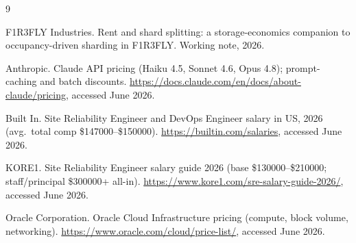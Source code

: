 \documentclass[11pt]{article}
\begin{document}
\begin{thebibliography}{9}

F1R3FLY Industries.
\newblock Rent and shard splitting: a storage-economics companion to occupancy-driven sharding in F1R3FLY.
\newblock Working note, 2026.

Anthropic.
\newblock Claude API pricing (Haiku 4.5, Sonnet 4.6, Opus 4.8); prompt-caching and batch discounts.
\newblock \url{https://docs.claude.com/en/docs/about-claude/pricing}, accessed June 2026.

Built In.
\newblock Site Reliability Engineer and DevOps Engineer salary in US, 2026
(avg.\ total comp \$\num{147000}--\$\num{150000}).
\newblock \url{https://builtin.com/salaries}, accessed June 2026.

KORE1.
\newblock Site Reliability Engineer salary guide 2026 (base \$\num{130000}--\$\num{210000};
staff/principal \$\num{300000}+ all-in).
\newblock \url{https://www.kore1.com/sre-salary-guide-2026/}, accessed June 2026.

Oracle Corporation.
\newblock Oracle Cloud Infrastructure pricing (compute, block volume, networking).
\newblock \url{https://www.oracle.com/cloud/price-list/}, accessed June 2026.

\end{thebibliography}
\end{document}
